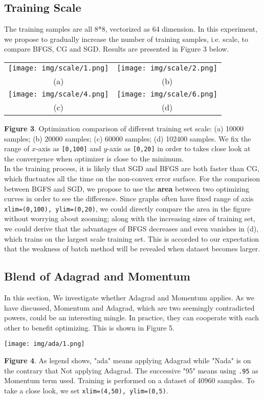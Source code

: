 \documentclass{article} %
\begin{document}
\subsection{Training Scale}
The training samples are all 8*8, vectorized as 64 dimension. In this experiment, we propose to gradually increase the number of training samples, i.e. scale, to compare BFGS, CG and SGD. Results are presented in Figure 3 below. \\
    \begin{tabular}{cc}
    \texttt{[image: img/scale/1.png]}  & \texttt{[image: img/scale/2.png]} \\
    (a) & (b) \\
    \texttt{[image: img/scale/4.png]}  & \texttt{[image: img/scale/6.png]} \\
    (c) & (d) \\
    \end{tabular}
    {\bf Figure 3}. Optimization comparison of different training set scale: (a) 10000 samples; (b) 20000 samples; (c) 60000 samples; (d) 102400 samples. We fix the range of $x$-axis as \texttt{[0,100]} and $y$-axis as \texttt{[0,20]} in order to takes close look at the convergence when optimizer is close to the minimum. \\
    
In the training process, it is likely that SGD and BFGS are both faster than CG, which fluctuates all the time on the non-convex error surface. For the comparison between BGFS and SGD, we propose to use the \textbf{area} between two optimizing curves in order to see the difference. Since graphs often have fixed range of axis \texttt{xlim=(0,100), ylim=(0,20)}, we could directly compare the area in the figure without worrying about zooming; along with the increasing sizes of training set, we could derive that the advantages of BFGS decreases and even vanishes in (d), which trains on the largest scale training set. This is accorded to our expectation that the weakness of batch method will be revealed when dataset becomes larger.

\subsection{Blend of Adagrad and Momentum}
In this section, We investigate whether Adagrad and Momentum applies. As we have discussed, Momentum and Adagrad, which are two seemingly contradicted powers, could be an interesting mingle. In practice, they can cooperate with each other to benefit optimizing. This is shown in Figure 5.\\
\begin{center}
\texttt{[image: img/ada/1.png]} 
\end{center}
{\bf Figure 4}. As legend shows, "ada" means applying Adagrad while "Nada" is on the contrary that Not applying Adagrad. The successive "95" means using \texttt{.95} as Momentum term used. Training is performed on a dataset of 40960 samples. To take a close look, we set \texttt{xlim=(4,50), ylim=(0,5)}.\\
\end{document}
